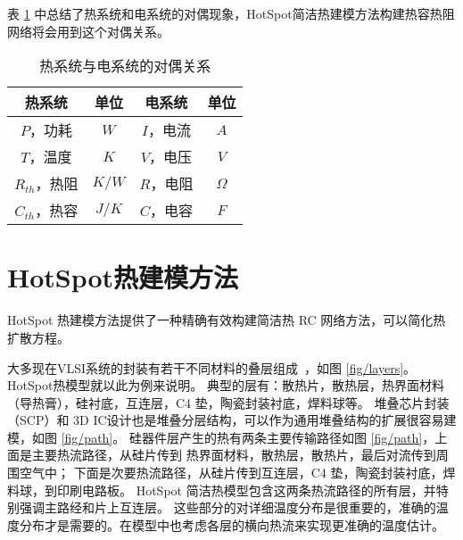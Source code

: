 表 \ref{tab:duality} 中总结了热系统和电系统的对偶现象，HotSpot简洁热建模方法构建热容热阻网络将会用到这个对偶关系。

\begin{table}[H]
\centering
\caption{热系统与电系统的对偶关系}\label{tab:duality}{
 \begin{tabular}{|c|c||c|c|}
 \hline
 \hline
 热系统 &  单位 & 电系统 & 单位 \\
 \hline 
 \hline
 $P$，功耗         & $W$   & $I$，电流 & $A$  \\
 \hline
 $T$，温度         & $K$   & $V$，电压 & $V$ \\
 \hline
 $R_{th}$，热阻    & $K/W$ & $R$，电阻 & $\Omega$ \\
 \hline
 $C_{th}$，热容    & $J/K$ & $C$，电容 & $F$ \\
 \hline
 \hline
 \end{tabular}
 }
 \end{table}
\section{HotSpot热建模方法}\label{sec:hotspot}

HotSpot 热建模方法提供了一种精确有效构建简洁热 RC 网络方法，可以简化热扩散方程。

大多现在VLSI系统的封装有若干不同材料的叠层组成~\cite{Huang:TVLSI'06}，如图 \ref{fig/layers}。
HotSpot热模型就以此为例来说明。
典型的层有：散热片，散热层，热界面材料（导热膏），硅衬底，互连层，C4 垫，陶瓷封装衬底，焊料球等。
堆叠芯片封装（SCP）和 3D IC设计也是堆叠分层结构，可以作为通用堆叠结构的扩展很容易建模，如图 \ref{fig/path}。
硅器件层产生的热有两条主要传输路径如图 \ref{fig/path}，上面是主要热流路径，从硅片传到 热界面材料，散热层，散热片，最后对流传到周围空气中；
下面是次要热流路径，从硅片传到互连层，C4 垫，陶瓷封装衬底，焊料球，到印刷电路板。
HotSpot 简洁热模型包含这两条热流路径的所有层，并特别强调主路经和片上互连层。
这些部分的对详细温度分布是很重要的，准确的温度分布才是需要的。在模型中也考虑各层的横向热流来实现更准确的温度估计。




